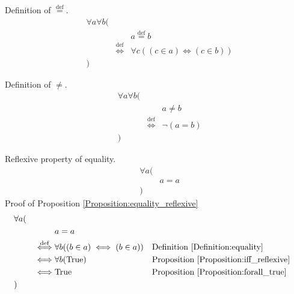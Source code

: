 \begin{defn}
\label{Definition:equality_def}
Definition of $\overset{\operatorname{def}}{=}$.
\begin{align*}
& \forall a \forall b ( \\
& & & a \overset{\operatorname{def}}{=} b \\
& & \overset{\operatorname{def}}{\iff} & \forall c ((c \in a) \iff (c \in b)) \\
& )
\end{align*}
\end{defn}

\begin{defn}
\label{Definition:neq}
Definition of $\neq$.
\begin{align*}
& \forall a \forall b ( \\
& & & a \neq b \\
& & \overset{\operatorname{def}}{\iff} & \lnot (a = b) \\
& )
\end{align*}
\end{defn}

\begin{prop}
\label{Proposition:equality_reflexive}
Reflexive property of equality.
\begin{align*}
& \forall a ( \\
& & a = a \\
& )
\end{align*}
Proof of Proposition \ref{Proposition:equality_reflexive}
\begin{align*}
& \forall a ( \\
& & & a = a \\
& & \overset{\operatorname{def}}{\iff} & \forall b ((b \in a) \iff (b \in a))
& & \text{Definition \ref{Definition:equality}} \\
& & \iff & \forall b (\text{True})
& & \text{Proposition \ref{Proposition:iff_reflexive}} \\
& & \iff & \text{True}
& & \text{Proposition \ref{Proposition:forall_true}} \\
& )
\end{align*}
\end{prop}


